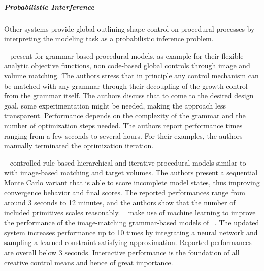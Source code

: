 \subparagraph{Probabilistic Interference}
\label{subara:analysis_rulebased_shapes_probabilistic}

Other systems provide global outlining shape control on procedural processes by interpreting the modeling task as a probabilistic inference problem.

\citeauthor*{talton_2011_mpm}~\cite{talton_2011_mpm} present for grammar-based procedural models, as example for their flexible analytic objective functions, non code-based global controls through image and volume matching. The authors stress that in principle any control mechanism can be matched with any grammar through their decoupling of the growth control from the grammar itself. The authors discuss that to come to the desired design goal, some experimentation might be needed, making the approach less transparent. Performance depends on the complexity of the grammar and the number of optimization steps needed. The authors report performance times ranging from a few seconds to several hours. For their examples, the authors manually terminated the optimization iteration.

\citeauthor*{ritchie_2015_cpm}~\cite{ritchie_2015_cpm} controlled rule-based hierarchical and iterative procedural models similar to \citeauthor*{talton_2011_mpm}~\cite{talton_2011_mpm} with image-based matching and target volumes. The authors present a sequential Monte Carlo variant that is able to score incomplete model states, thus improving convergence behavior and final scores. The reported performances range from around 3 seconds to 12 minutes, and the authors show that the number of included primitives scales reasonably. \citeauthor*{ritchie_2016_ngp}~\cite{ritchie_2016_ngp} make use of machine learning to improve the performance of the image-matching grammar-based models of \citeauthor*{ritchie_2015_cpm}~\cite{ritchie_2015_cpm}. The updated system increases performance up to 10 times by integrating a neural network and sampling a learned constraint-satisfying approximation. Reported performances are overall below 3 seconds. Interactive performance is the foundation of all creative control means and hence of great importance.





